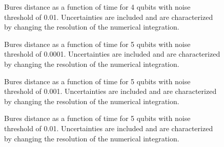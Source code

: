\pagebreak

\begin{figure}[h]
\begin{center}
\end{center}
\caption{Bures distance as a function of time for 4 qubits with noise
threshold of 0.01.  Uncertainties are included and are characterized 
by changing the resolution of the numerical integration.}
\end{figure}

\pagebreak

\begin{figure}[h]
\begin{center}
\end{center}
\caption{Bures distance as a function of time for 5 qubits with noise
threshold of 0.0001.  Uncertainties are included and are characterized 
by changing the resolution of the numerical integration.}
\end{figure}

\pagebreak

\begin{figure}[h]
\begin{center}
\end{center}
\caption{Bures distance as a function of time for 5 qubits with noise
threshold of 0.001.  Uncertainties are included and are characterized 
by changing the resolution of the numerical integration.}
\end{figure}

\pagebreak

\begin{figure}[h]
\begin{center}
\end{center}
\caption{Bures distance as a function of time for 5 qubits with noise
threshold of 0.01.  Uncertainties are included and are characterized 
by changing the resolution of the numerical integration.}
\end{figure}

